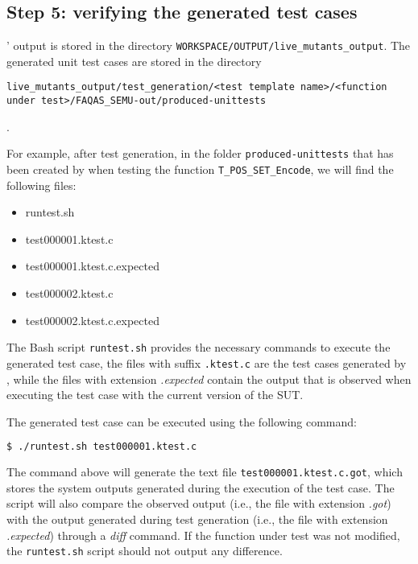 \subsection{Step 5: verifying the generated test cases}

\SEMUS' output is stored in the directory \texttt{WORKSPACE/OUTPUT/live\_mutants\_output}. The generated unit test cases are stored in the directory \begin{small}\texttt{live\_mutants\_output/test\_generation/<test template name>/<function under test>/FAQAS\_SEMU-out/produced-unittests}\end{small}.

For example, after test generation, in the folder \texttt{produced-unittests} that has been created by \SEMUS when testing the function \texttt{T\_POS\_SET\_Encode}, we will find the following files:

\begin{itemize}
\item runtest.sh
\item test000001.ktest.c
\item test000001.ktest.c.expected
\item test000002.ktest.c
\item test000002.ktest.c.expected
\end{itemize}

The Bash script \texttt{runtest.sh} provides the necessary commands to execute the generated test case, the files with suffix \texttt{.ktest.c}  are the test cases generated by \SEMUS, while the files with extension \emph{.expected} contain the output that is observed when executing the test case with the current version of the SUT.

The generated test case can be executed using the following command:

\begin{lstlisting}[language=bash]
 $ ./runtest.sh test000001.ktest.c
\end{lstlisting}

The command above will generate the text file \texttt{test000001.ktest.c.got}, which stores the system outputs generated during the execution of the test case. The script will also compare the observed output (i.e., the file with extension \emph{.got}) with the output generated during test generation (i.e., the file with extension \emph{.expected}) through a \emph{diff} command. If the function under test was not modified, the \texttt{runtest.sh} script should not output any difference. 

